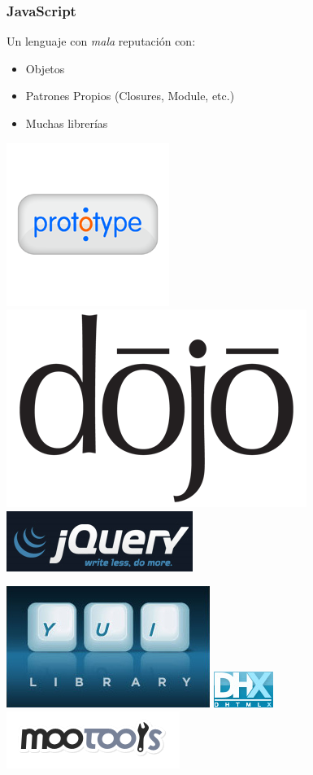 \documentclass{beamer}
\begin{document}
\begin{frame}
    \frametitle{JavaScript}
    \par{Un lenguaje con {\it mala} reputación con:}
    \begin{itemize}
          \item Objetos
          \item Patrones Propios (Closures, Module, etc.)
          \item Muchas librerías                    
    \end{itemize}
    \vfill
    \par{
        \includegraphics[scale=0.4]{prototype.png}\hfill
        \includegraphics[scale=0.2]{dojo.png}\hfill  
        \includegraphics[scale=0.4]{jquery.png}
    }
    \par{
        \includegraphics[scale=0.2]{yui.jpg}\hfill
        \includegraphics[scale=0.5]{DHX_logo.jpg}\hfill
        \includegraphics[scale=0.3]{mootools.png}
    }
\end{frame}
\end{document}
